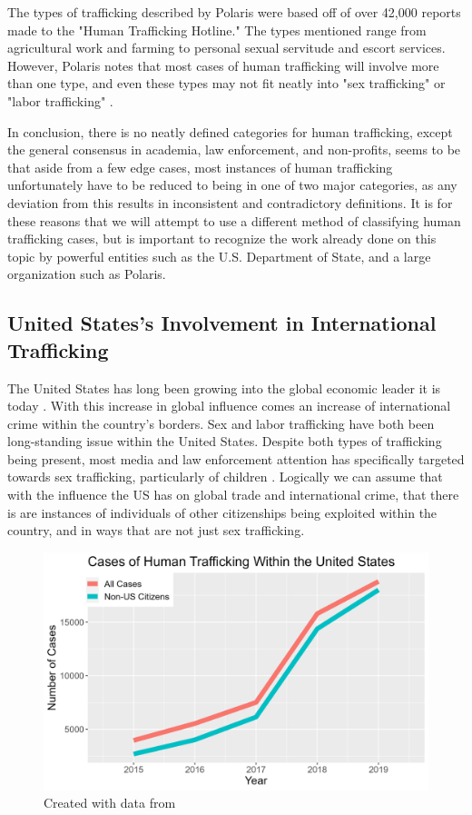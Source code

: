 \documentclass{article} %
\begin{document}
The types of trafficking described by Polaris were based off of over 42,000 reports made to the "Human Trafficking Hotline." The types mentioned range from agricultural work and farming to personal sexual servitude and escort services. However, Polaris notes that most cases of human trafficking will involve more than one type, and even these types may not fit neatly into "sex trafficking" or "labor trafficking" \parencite{polarisTypology}.

In conclusion, there is no neatly defined categories for human trafficking, except the general consensus in academia, law enforcement, and non-profits, seems to be that aside from a few edge cases, most instances of human trafficking unfortunately have to be reduced to being in one of two major categories, as any deviation from this results in inconsistent and contradictory definitions. It is for these reasons that we will attempt to use a different method of classifying human trafficking cases, but is important to recognize the work already done on this topic by powerful entities such as the U.S. Department of State, and a large organization such as Polaris.

\subsection*{United States's Involvement in International Trafficking}

The United States has long been growing into the global economic leader it is today \parencite{USEconPower}. With this increase in global influence comes an increase of international crime within the country's borders. Sex and labor trafficking have both been long-standing issue within the United States. Despite both types of trafficking being present, most media and law enforcement attention has specifically targeted towards sex trafficking, particularly of children \parencite{MediaRep}. Logically we can assume that with the influence the US has on global trade and international crime, that there is are instances of individuals of other citizenships being exploited within the country, and in ways that are not just sex trafficking.

\FloatBarrier

\begin{figure}[H]
	\includegraphics[width = \textwidth]{USTrafficking}
	\scriptsize{\caption{Created with data from \cite{CTDC}}}
\end{figure}
\end{document}
